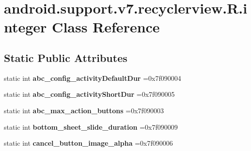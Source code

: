 \hypertarget{classandroid_1_1support_1_1v7_1_1recyclerview_1_1R_1_1integer}{}\section{android.\+support.\+v7.\+recyclerview.\+R.\+integer Class Reference}
\label{classandroid_1_1support_1_1v7_1_1recyclerview_1_1R_1_1integer}
\subsection*{Static Public Attributes}
\begin{DoxyCompactItemize}
\item 
\mbox{\label{classandroid_1_1support_1_1v7_1_1recyclerview_1_1R_1_1integer_a4714b01964f7023cb2c6e9a28d352b89}} 
static int {\bfseries abc\+\_\+config\+\_\+activity\+Default\+Dur} =0x7f090004
\item 
\mbox{\label{classandroid_1_1support_1_1v7_1_1recyclerview_1_1R_1_1integer_a88e5af0e208e78c70990f9a0c7323827}} 
static int {\bfseries abc\+\_\+config\+\_\+activity\+Short\+Dur} =0x7f090005
\item 
\mbox{\label{classandroid_1_1support_1_1v7_1_1recyclerview_1_1R_1_1integer_abad35cde32e5ca8cc26b88d0cc51bb22}} 
static int {\bfseries abc\+\_\+max\+\_\+action\+\_\+buttons} =0x7f090003
\item 
\mbox{\label{classandroid_1_1support_1_1v7_1_1recyclerview_1_1R_1_1integer_afacf6fe316a79d40b2a0ec1a0a328f5e}} 
static int {\bfseries bottom\+\_\+sheet\+\_\+slide\+\_\+duration} =0x7f090009
\item 
\mbox{\label{classandroid_1_1support_1_1v7_1_1recyclerview_1_1R_1_1integer_afeaf67badf60e8624d4e187c1339e209}} 
static int {\bfseries cancel\+\_\+button\+\_\+image\+\_\+alpha} =0x7f090006
\item 
\mbox{\label{classandroid_1_1support_1_1v7_1_1recyclerview_1_1R_1_1integer_aaf9a9452a8c0597a2711323c892fd17e}} 

\end{DoxyCompactItemize}
